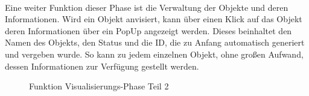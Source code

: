 \\ 
Eine weiter Funktion dieser Phase ist die Verwaltung der Objekte und deren Informationen. Wird ein Objekt anvisiert, kann über einen Klick auf das Objekt 
deren Informationen über ein PopUp angezeigt werden. Dieses beinhaltet den Namen des Objekts, den Status und die ID, die zu Anfang automatisch generiert 
und vergeben wurde. So kann zu jedem einzelnen Objekt, ohne großen Aufwand, dessen Informationen zur Verfügung gestellt werden. 
\begin{figure}[hbt!]
    \centering
    \caption{Funktion Visualisierungs-Phase Teil 2}
    \label{pic:showdatatoobj}
\end{figure}
